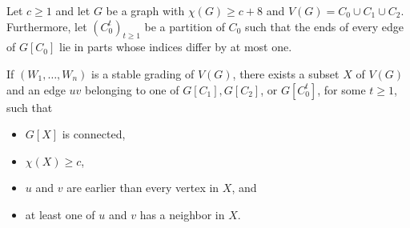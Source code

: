\documentclass[10pt,a4paper]{amsart}
\begin{document}
\begin{lemma}\label{lemma1:beyond_leveling}
    Let $c \geq 1$ and let $G$ be a graph with $\chi(G) \geq c + 8$ and $V(G) = C_0 \cup C_1 \cup C_2$.
    Furthermore, let \((C_0^t)_{t\geq 1}\) be a partition of \(C_0\) such that the ends of every edge of \(G[C_0]\) lie in parts whose indices differ by at most one.

    If $(W_1, \dots, W_n)$ is a stable grading of $V(G)$, there exists a subset $X$ of $V(G)$ and an edge $uv$ belonging to one of $G[C_1], G[C_2]$, or $G[C_0^t]$, for some $t \geq 1$, such that
    \begin{itemize}
        \item $G[X]$ is connected,
        \item $\chi(X) \geq c$,
        \item $u$ and $v$ are earlier than every vertex in $X$, and
        \item at least one of $u$ and $v$ has a neighbor in $X$.
    \end{itemize}
        \end{lemma}
\end{document}
